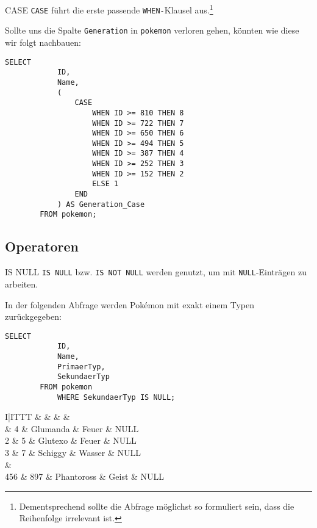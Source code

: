 \begin{sql}{CASE}
    \texttt{CASE} führt die erste passende \texttt{WHEN-}Klausel aus.\footnote{Dementsprechend sollte die Abfrage möglichst so formuliert sein, dass die Reihenfolge irrelevant ist.}

    Sollte uns die Spalte \texttt{Generation} in \texttt{pokemon} verloren gehen, könnten wie diese wir folgt nachbauen:

    \begin{lstlisting}[language=mysql]
        SELECT
            ID,
            Name,
            (
                CASE
                    WHEN ID >= 810 THEN 8
                    WHEN ID >= 722 THEN 7
                    WHEN ID >= 650 THEN 6
                    WHEN ID >= 494 THEN 5
                    WHEN ID >= 387 THEN 4
                    WHEN ID >= 252 THEN 3
                    WHEN ID >= 152 THEN 2
                    ELSE 1
                END
            ) AS Generation_Case
        FROM pokemon;
    \end{lstlisting}
\end{sql}

\subsection{Operatoren}

\begin{sql}{IS NULL}
    \texttt{IS NULL} bzw. \texttt{IS NOT NULL} werden genutzt, um mit \texttt{NULL}-Einträgen zu arbeiten.

    In der folgenden Abfrage werden Pokémon mit exakt einem Typen zurückgegeben:

    \begin{lstlisting}[language=mysql]
        SELECT
            ID,
            Name,
            PrimaerTyp,
            SekundaerTyp
        FROM pokemon
            WHERE SekundaerTyp IS NULL;
    \end{lstlisting}

    \setcounter{rownum}{0}
    \begin{tabular}{I|ITTT}
        &  &  &  &  \\ & 4 & Glumanda & Feuer & NULL \\
        2 & 5 & Glutexo & Feuer & NULL \\
        3 & 7 & Schiggy & Wasser & NULL \\
         &  \\
        456 & 897 & Phantoross & Geist & NULL \\
    \end{tabular}
\end{sql}

